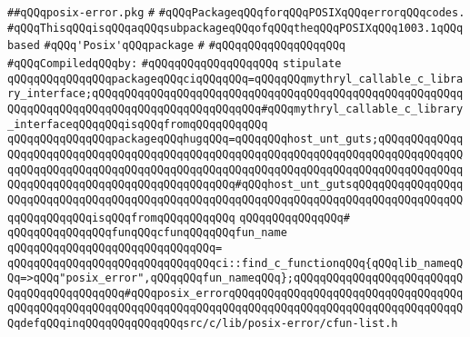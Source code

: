 \label{src/lib/std/src/psx/posix-error.pkg}
\verb|##qQQqposix-error.pkg|\newline
\verb|#|\newline
\verb|#qQQqPackageqQQqforqQQqPOSIXqQQqerrorqQQqcodes.|\newline
\verb|#qQQqThisqQQqisqQQqaqQQqsubpackageqQQqofqQQqtheqQQqPOSIXqQQq1003.1qQQqbased|\newline
\verb|#qQQq'Posix'qQQqpackage|\newline
\verb|#|\newline
\verb|#qQQqqQQqqQQqqQQqqQQq|\newline
\newline
\verb|#qQQqCompiledqQQqby:|\newline
\verb|#qQQqqQQqqQQqqQQqqQQq|\newline
\newline
\newline
\newline
\newline
\verb|stipulate|\newline
\verb|qQQqqQQqqQQqqQQqpackageqQQqciqQQqqQQq=qQQqqQQqmythryl_callable_c_library_interface;qQQqqQQqqQQqqQQqqQQqqQQqqQQqqQQqqQQqqQQqqQQqqQQqqQQqqQQqqQQqqQQqqQQqqQQqqQQqqQQqqQQqqQQqqQQqqQQq#qQQqmythryl_callable_c_library_interfaceqQQqqQQqisqQQqfromqQQqqQQqqQQq|\newline
\verb|qQQqqQQqqQQqqQQqpackageqQQqhugqQQq=qQQqqQQqhost_unt_guts;qQQqqQQqqQQqqQQqqQQqqQQqqQQqqQQqqQQqqQQqqQQqqQQqqQQqqQQqqQQqqQQqqQQqqQQqqQQqqQQqqQQqqQQqqQQqqQQqqQQqqQQqqQQqqQQqqQQqqQQqqQQqqQQqqQQqqQQqqQQqqQQqqQQqqQQqqQQqqQQqqQQqqQQqqQQqqQQqqQQqqQQqqQQq#qQQqhost_unt_gutsqQQqqQQqqQQqqQQqqQQqqQQqqQQqqQQqqQQqqQQqqQQqqQQqqQQqqQQqqQQqqQQqqQQqqQQqqQQqqQQqqQQqqQQqqQQqqQQqqQQqisqQQqfromqQQqqQQqqQQq|\newline
\verb|qQQqqQQqqQQqqQQq#|\newline
\verb|qQQqqQQqqQQqqQQqfunqQQqcfunqQQqqQQqfun_name|\newline
\verb|qQQqqQQqqQQqqQQqqQQqqQQqqQQqqQQq=|\newline
\verb|qQQqqQQqqQQqqQQqqQQqqQQqqQQqqQQqci::find_c_functionqQQq{qQQqlib_nameqQQq=>qQQq"posix_error",qQQqqQQqfun_nameqQQq};qQQqqQQqqQQqqQQqqQQqqQQqqQQqqQQqqQQqqQQqqQQq#qQQqposix_errorqQQqqQQqqQQqqQQqqQQqqQQqqQQqqQQqqQQqqQQqqQQqqQQqqQQqqQQqqQQqqQQqqQQqqQQqqQQqqQQqqQQqqQQqqQQqqQQqqQQqqQQqqQQqdefqQQqinqQQqqQQqqQQqqQQqsrc/c/lib/posix-error/cfun-list.h|\newline
